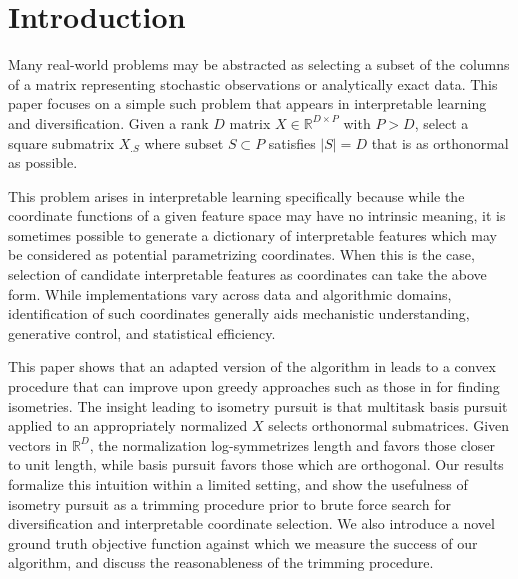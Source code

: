 \section{Introduction}
\label{sec:introduction}

Many real-world problems may be abstracted as selecting a subset of the columns of a matrix representing stochastic observations or analytically exact data.
This paper focuses on a simple such problem that appears in interpretable learning and diversification.
Given a rank $D$ matrix $ X \in \mathbb R^{D \times P}$ with $P > D$, select a square submatrix $ X_{. S}$ where subset $ S \subset P$ satisfies $| S| = D$ that is as orthonormal as possible.

This problem arises in interpretable learning specifically because while the coordinate functions of a given feature space may have no intrinsic meaning, it is sometimes possible to generate a dictionary of interpretable features which may be considered as potential parametrizing coordinates.
When this is the case, selection of candidate interpretable features as coordinates can take the above form.
While implementations vary across data and algorithmic domains, identification of such coordinates generally aids mechanistic understanding, generative control, and statistical efficiency.

This paper shows that an adapted version of the algorithm in \citet{Koelle2024-no} leads to a convex procedure that can improve upon greedy approaches such as those in \citet{5895106, NEURIPS2019_6a10bbd4, Kohli2021-lr, Jones2007-uc} for finding isometries.
The insight leading to isometry pursuit is that multitask basis pursuit applied to an appropriately normalized $ X$ selects orthonormal submatrices.
Given vectors in $\mathbb R^D$, the normalization log-symmetrizes length and favors those closer to unit length, while basis pursuit favors those which are orthogonal.
Our results formalize this intuition within a limited setting, and show the usefulness of isometry pursuit as a trimming procedure prior to brute force search for diversification and interpretable coordinate selection.
We also introduce a novel ground truth objective function against which we measure the success of our algorithm, and discuss the reasonableness of the trimming procedure.

